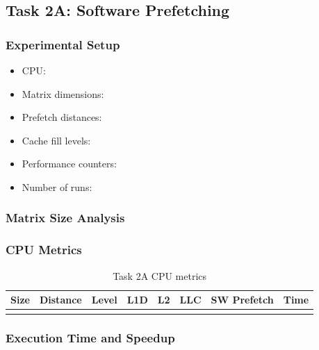 
\subsection{Task 2A: Software Prefetching}

\subsubsection{Experimental Setup}

\begin{itemize}
    \item CPU: 
    \item Matrix dimensions: 
    \item Prefetch distances: 
    \item Cache fill levels: 
    \item Performance counters: 
    \item Number of runs: 
\end{itemize}

\subsubsection{Matrix Size Analysis}


\subsubsection{CPU Metrics}

\begin{table}[H]
\centering
\caption{Task 2A CPU metrics}
\begin{tabular}{lccccccc}
\toprule
Size & Distance & Level & L1D & L2 & LLC & SW Prefetch & Time \\
\midrule
\TODO{...} & \TODO{...} & \TODO{...} &
\TODO{...} & \TODO{...} & \TODO{...} & \TODO{...} & \TODO{...} \\
\bottomrule
\end{tabular}
\end{table}


\subsubsection{Execution Time and Speedup}

